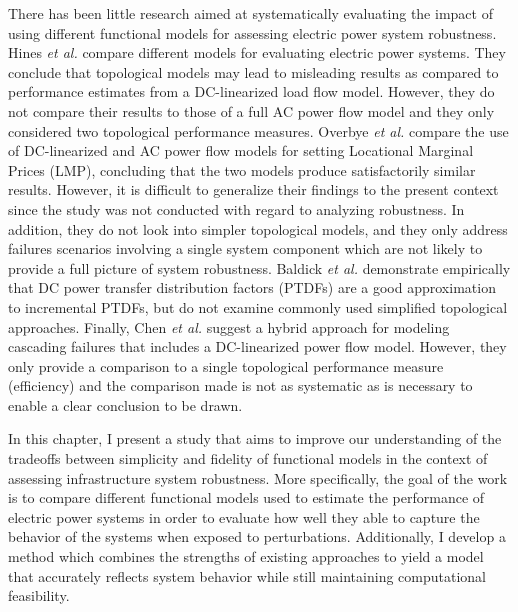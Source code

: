 There has been little research aimed at systematically evaluating the impact of using different functional models for assessing electric power system robustness. Hines \emph{et al.} \cite{Hines2010} compare different models for evaluating electric power systems. They conclude that topological models may lead to misleading results as compared to performance estimates from a DC-linearized load flow model. However, they do not compare their results to those of a full AC power flow model and they only considered two topological performance measures. Overbye \emph{et al.} \cite{Overbye2004} compare the use of DC-linearized and AC power flow models for setting Locational Marginal Prices (LMP), concluding that the two models produce satisfactorily similar results. However, it is difficult to generalize their findings to the present context since the study was not conducted with regard to analyzing robustness. In addition, they do not look into simpler topological models, and they only address failures scenarios involving a single system component which are not likely to provide a full picture of system robustness. Baldick  \emph{et al.} \cite{Baldick2005} demonstrate empirically that DC power transfer distribution factors (PTDFs) are a good approximation to incremental PTDFs, but do not examine commonly used simplified topological approaches. Finally, Chen \emph{et al.} \cite{Chen2010} suggest a hybrid approach for modeling cascading failures that includes a DC-linearized power flow model. However, they only provide a comparison to a single topological performance measure (efficiency) and the comparison made is not as systematic as is necessary to enable a clear conclusion to be drawn.

In this chapter, I present a study that aims to improve our understanding of the tradeoffs between simplicity and fidelity of functional models in the context of assessing infrastructure system robustness. More specifically, the goal of the work is to compare different functional models used to estimate the performance of electric power systems in order to evaluate how well they able to capture the behavior of the systems when exposed to perturbations.  Additionally, I develop a method which combines the strengths of existing approaches to yield a model that accurately reflects system behavior while still maintaining computational feasibility.


